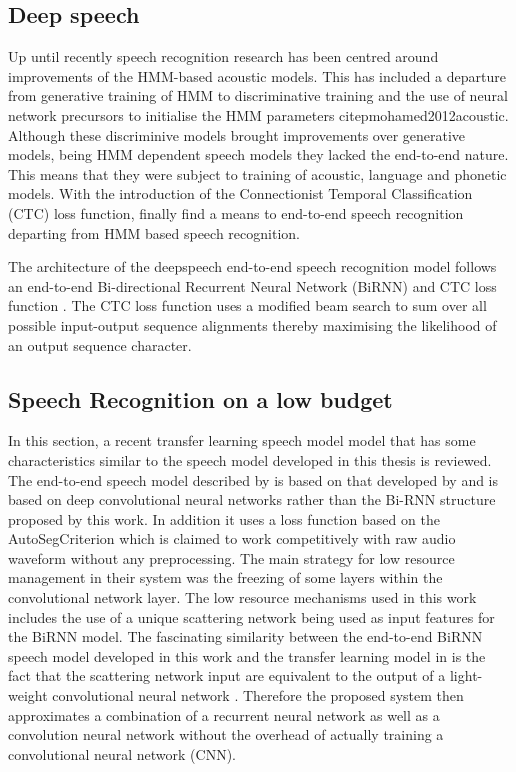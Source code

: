 \subsection{Deep speech}
Up until recently speech recognition research has been centred around improvements of the HMM-based acoustic models.  This has included a departure from generative training of HMM to discriminative training \citep{woodland2000large} and the use of neural network precursors to initialise the HMM parameters citep{mohamed2012acoustic}.  Although these  discriminive models brought improvements over generative models, being HMM dependent speech models they lacked the end-to-end nature.  This means that they were subject to training of acoustic, language and phonetic models.  With the introduction of the Connectionist Temporal Classification (CTC) loss  function, \cite{graves2014towards} finally find a means to end-to-end speech recognition departing from HMM based speech recognition. 

The architecture of the deepspeech end-to-end speech recognition model \cite{hannun2014first} follows an end-to-end Bi-directional Recurrent Neural Network (BiRNN) and CTC loss function \citep{graves2006connectionist}.  The CTC loss function uses a modified beam search to sum over all possible input-output sequence alignments thereby maximising the likelihood of an output sequence character.

\subsection{Speech Recognition on a low budget}

In this section, a recent transfer learning speech model model \citep{kunze2017transfer} that has some characteristics similar to the speech model developed in this thesis is reviewed.  The end-to-end speech model described by \cite{kunze2017transfer} is based on that developed by \cite{collobert2016wav2letter} and is based on deep convolutional neural networks rather than the Bi-RNN structure proposed by this work.  In addition it uses a loss function based on the AutoSegCriterion which is claimed to work competitively with raw audio waveform without any preprocessing.  The main strategy for low resource management in their system was the freezing of some layers within the convolutional network layer.  The low resource mechanisms used in this work includes the use of a unique scattering network being used as input features for the BiRNN model.  The fascinating similarity between the end-to-end BiRNN speech model developed in this work and the transfer learning model in \cite{kunze2017transfer} is the fact that the scattering network input are equivalent to the output of a light-weight convolutional neural network \cite{hannun2014first}.  Therefore the proposed system then approximates a combination of a recurrent neural network as well as a convolution neural network without the overhead of actually training a convolutional neural network (CNN).

